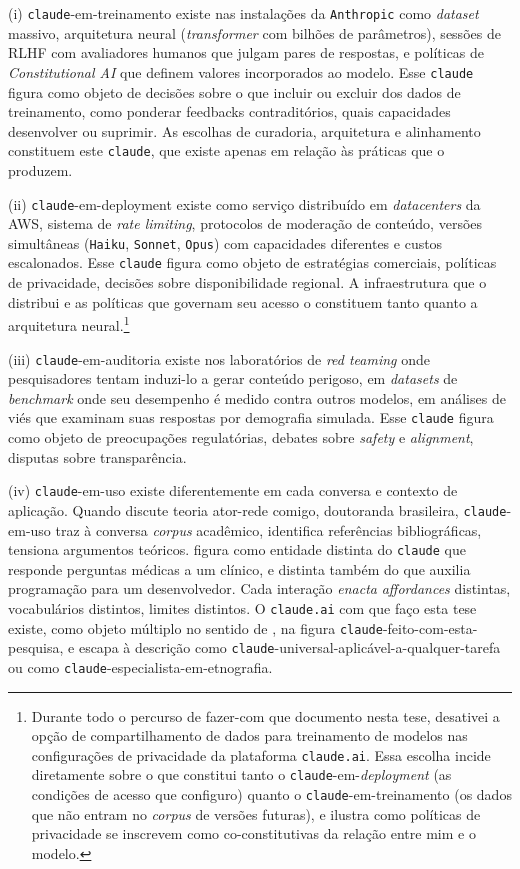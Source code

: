 (i) \texttt{claude}-em-treinamento existe nas instalações da \texttt{Anthropic} como \textit{dataset} massivo, arquitetura neural (\textit{transformer} com bilhões de parâmetros), sessões de RLHF com avaliadores humanos que julgam pares de respostas, e políticas de \textit{Constitutional AI} que definem valores incorporados ao modelo. Esse \texttt{claude} figura como objeto de decisões sobre o que incluir ou excluir dos dados de treinamento, como ponderar feedbacks contraditórios, quais capacidades desenvolver ou suprimir. As escolhas de curadoria, arquitetura e alinhamento constituem este \texttt{claude}, que existe apenas em relação às práticas que o produzem.

(ii) \texttt{claude}-em-deployment existe como serviço distribuído em \textit{datacenters} da AWS, sistema de \textit{rate limiting}, protocolos de moderação de conteúdo, versões simultâneas (\texttt{Haiku}, \texttt{Sonnet}, \texttt{Opus}) com capacidades diferentes e custos escalonados. Esse \texttt{claude} figura como objeto de estratégias comerciais, políticas de privacidade, decisões sobre disponibilidade regional. A infraestrutura que o distribui e as políticas que governam seu acesso o constituem tanto quanto a arquitetura neural.\footnote{Durante todo o percurso de fazer-com que documento nesta tese, desativei a opção de compartilhamento de dados para treinamento de modelos nas configurações de privacidade da plataforma \texttt{claude.ai}. Essa escolha incide diretamente sobre o que constitui tanto o \texttt{claude}-em-\textit{deployment} (as condições de acesso que configuro) quanto o \texttt{claude}-em-treinamento (os dados que não entram no \textit{corpus} de versões futuras), e ilustra como políticas de privacidade se inscrevem como co-constitutivas da relação entre mim e o modelo.}

(iii) \texttt{claude}-em-auditoria existe nos laboratórios de \textit{red teaming} onde pesquisadores tentam induzi-lo a gerar conteúdo perigoso, em \textit{datasets} de \textit{benchmark} onde seu desempenho é medido contra outros modelos, em análises de viés que examinam suas respostas por demografia simulada. Esse \texttt{claude} figura como objeto de preocupações regulatórias, debates sobre \textit{safety} e \textit{alignment}, disputas sobre transparência.

(iv) \texttt{claude}-em-uso existe diferentemente em cada conversa e contexto de aplicação. Quando discute teoria ator-rede comigo, doutoranda brasileira, \texttt{claude}-em-uso traz à conversa \textit{corpus} acadêmico, identifica referências bibliográficas, tensiona argumentos teóricos. figura como entidade distinta do \texttt{claude} que responde perguntas médicas a um clínico, e distinta também do que auxilia programação para um desenvolvedor.
Cada interação \textit{enacta} \textit{affordances} distintas, vocabulários distintos, limites distintos. O \texttt{claude.ai} com que faço esta tese existe, como objeto múltiplo no sentido de \textcite{mol2002body}, na figura \texttt{claude}-feito-com-esta-pesquisa, e escapa à descrição como \texttt{claude}-universal-aplicável-a-qualquer-tarefa ou como \texttt{claude}-especialista-em-etnografia.

